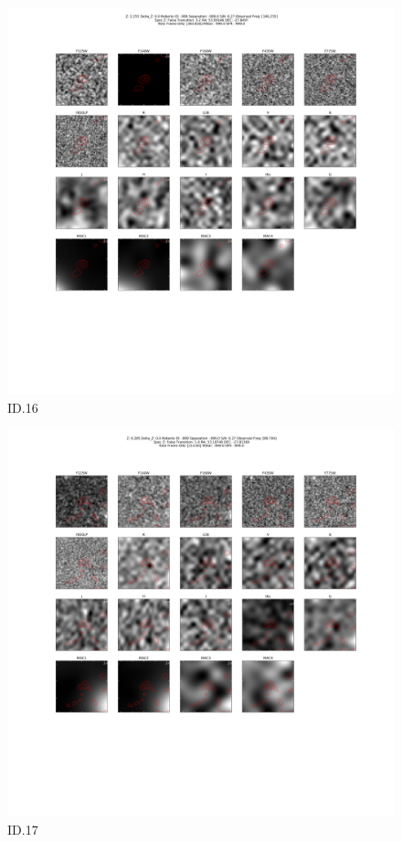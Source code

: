 \begin{figure}[tbp]
\centering \includegraphics[width=120mm]{Matched/ASPECS_Cutout_16.png}
\caption{ID.16}
\label{fig:Match_Three}
\end{figure}

\begin{figure}[tbp]
\centering \includegraphics[width=120mm]{Matched/ASPECS_Cutout_17.png}
\caption{ID.17}
\label{fig:Match_Three}
\end{figure}

